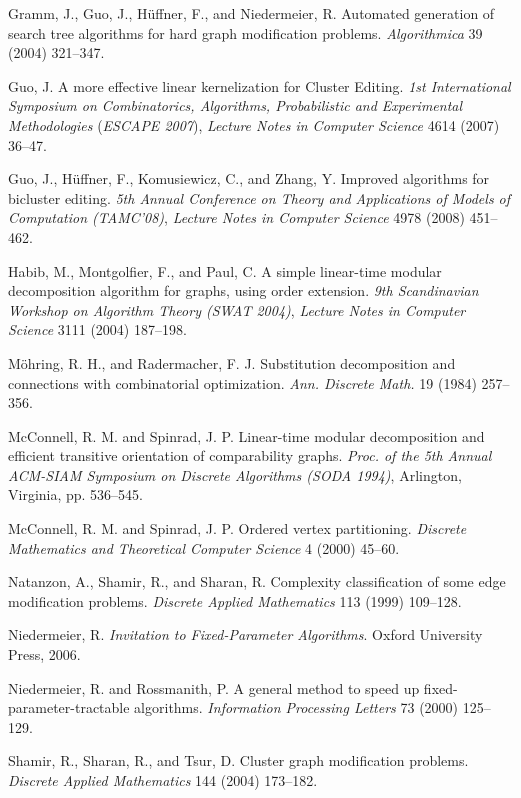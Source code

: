 \documentclass[12pt]{article}
\begin{document}
\begin{thebibliography}{99}
Gramm, J., Guo, J., H\"uffner, F., and Niedermeier, R. Automated
generation of search tree algorithms for hard graph modification
problems. \emph{Algorithmica} 39 (2004) 321--347.

Guo, J. A more effective linear kernelization for Cluster Editing.
\emph{1st International Symposium on Combinatorics, Algorithms,
Probabilistic and Experimental Methodologies }(\emph{ESCAPE
2007}), \emph{Lecture Notes in Computer Science} 4614 (2007)
36--47.

Guo, J., H\"uffner, F., Komusiewicz, C., and Zhang, Y. Improved algorithms for bicluster editing.
\emph{5th Annual Conference on Theory and Applications of Models of Computation (TAMC'08)}, \emph{Lecture Notes in Computer Science} 4978 (2008) 451--462.

Habib, M., Montgolfier, F., and Paul, C. A simple linear-time modular decomposition algorithm for graphs, using order extension.
{\em 9th Scandinavian Workshop on Algorithm Theory (SWAT 2004)}, {\em Lecture Notes in Computer Science} 3111 (2004) 187--198.

M\"ohring, R. H., and Radermacher, F. J.
Substitution decomposition and connections with combinatorial optimization.
{\em Ann. Discrete Math.} 19 (1984) 257--356.

McConnell, R. M. and Spinrad, J. P. Linear-time modular
decomposition and efficient transitive orientation of
comparability graphs. {\em Proc. of the 5th Annual ACM-SIAM Symposium on Discrete Algorithms (SODA 1994)}, Arlington, Virginia, pp. 536--545.

McConnell, R. M. and Spinrad, J. P. Ordered vertex partitioning.
{\em Discrete Mathematics and Theoretical Computer Science} 4
(2000) 45--60.

Natanzon, A., Shamir, R., and Sharan, R. Complexity classification of
some edge modification problems. {\em Discrete Applied
Mathematics} 113 (1999) 109--128.

Niedermeier, R. \emph{Invitation to Fixed-Parameter Algorithms}.
Oxford University Press, 2006.

Niedermeier, R. and Rossmanith, P. A general method to speed up
fixed-parameter-tractable algorithms. \emph{Information Processing
Letters} 73 (2000) 125--129.

Shamir, R., Sharan, R., and Tsur, D. Cluster graph modification
problems. {\em Discrete Applied Mathematics} 144 (2004) 173--182.

\end{thebibliography}
\end{document}
